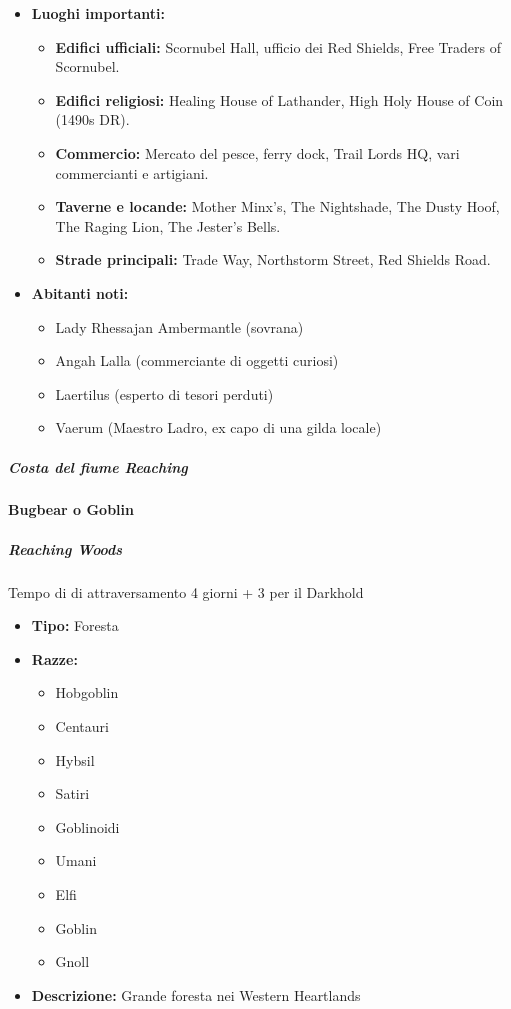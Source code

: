 \documentclass{article}
\begin{document}
\begin{itemize}
\begin{itemize}
    \end{itemize}
    \item \textbf{Luoghi importanti:} 
    \begin{itemize}
        \item \textbf{Edifici ufficiali:} Scornubel Hall, ufficio dei Red Shields, Free Traders of Scornubel.
        \item \textbf{Edifici religiosi:} Healing House of Lathander, High Holy House of Coin (1490s DR).
        \item \textbf{Commercio:} Mercato del pesce, ferry dock, Trail Lords HQ, vari commercianti e artigiani.
        \item \textbf{Taverne e locande:} Mother Minx's, The Nightshade, The Dusty Hoof, The Raging Lion, The Jester's Bells.
        \item \textbf{Strade principali:} Trade Way, Northstorm Street, Red Shields Road.
    \end{itemize}
    \item \textbf{Abitanti noti:} 
    \begin{itemize}
        \item Lady Rhessajan Ambermantle (sovrana)
        \item Angah Lalla (commerciante di oggetti curiosi)
        \item Laertilus (esperto di tesori perduti)
        \item Vaerum (Maestro Ladro, ex capo di una gilda locale)
    \end{itemize}
\end{itemize}


\subparagraph{Costa del fiume Reaching}
 \textbf{Bugbear o Goblin}



\subparagraph{Reaching Woods} 
Tempo di di attraversamento 4 giorni + 3 per il Darkhold  
\begin{itemize}
    \item \textbf{Tipo:} Foresta
    \item \textbf{Razze:} 
    \begin{itemize}
        \item Hobgoblin
        \item Centauri
        \item Hybsil
        \item Satiri
        \item Goblinoidi
        \item Umani
        \item Elfi
        \item Goblin
        \item Gnoll
    \end{itemize}
    \item \textbf{Descrizione:} Grande foresta nei Western Heartlands
\end{itemize}
\end{document}

